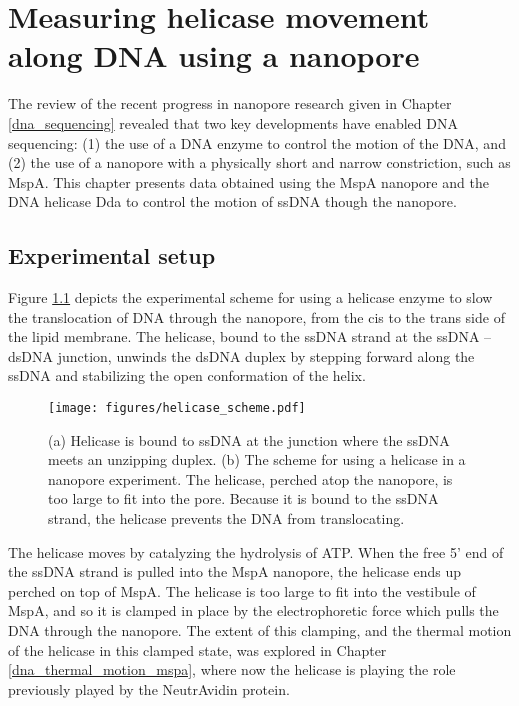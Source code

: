 
\chapter{Measuring helicase movement along DNA using a nanopore}
\label{helicase_on_dna}

The review of the recent progress in nanopore research given in Chapter \ref{dna_sequencing} revealed that two key developments have enabled DNA sequencing: (1) the use of a DNA enzyme to control the motion of the DNA, and (2) the use of a nanopore with a physically short and narrow constriction, such as MspA.  This chapter presents data obtained using the MspA nanopore and the DNA helicase Dda to control the motion of ssDNA though the nanopore.

\section{Experimental setup}

Figure \ref{fig:helicase_scheme} depicts the experimental scheme for using a helicase enzyme to slow the translocation of DNA through the nanopore, from the cis to the trans side of the lipid membrane.  The helicase, bound to the ssDNA strand at the ssDNA – dsDNA junction, unwinds the dsDNA duplex by stepping forward along the ssDNA and stabilizing the open conformation of the helix.

\begin{figure}[h]
\begin{centering}
\texttt{[image: figures/helicase\_scheme.pdf]}
\caption[Helicase can control DNA translocation]{(a) Helicase is bound to ssDNA at the junction where the ssDNA meets an unzipping duplex.  (b) The scheme for using a helicase in a nanopore experiment.  The helicase, perched atop the nanopore, is too large to fit into the pore.  Because it is bound to the ssDNA strand, the helicase prevents the DNA from translocating.}
\label{fig:helicase_scheme}
\end{centering}
\end{figure}

The helicase moves by catalyzing the hydrolysis of ATP.  When the free 5’ end of the ssDNA strand is pulled into the MspA nanopore, the helicase ends up perched on top of MspA.  The helicase is too large to fit into the vestibule of MspA, and so it is clamped in place by the electrophoretic force which pulls the DNA through the nanopore.  The extent of this clamping, and the thermal motion of the helicase in this clamped state, was explored in Chapter \ref{dna_thermal_motion_mspa}, where now the helicase is playing the role previously played by the NeutrAvidin protein.

